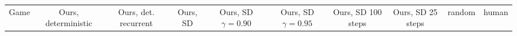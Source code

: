 \begin{landscape}
\begin{changemargin}{0cm}{0cm}
\begin{center}
\vspace*{\fill}
\setlength{\tabcolsep}{5pt}
\begin{table}[!htbp]
\scriptsize
\begin{tabular}{l|rl|rl|rl|rl|rl|rl|rl|c|c}

Game &          \multicolumn{2}{|c|}{Ours, deterministic}  &     \multicolumn{2}{|c|}{Ours, det. recurrent}   &     \multicolumn{2}{|c|}{Ours, SD} &     \multicolumn{2}{|c|}{Ours, SD $\gamma=0.90$}   &     \multicolumn{2}{|c|}{Ours, SD $\gamma=0.95$} &          \multicolumn{2}{|c|}{Ours, SD 100 steps}	&     \multicolumn{2}{|c|}{Ours, SD 25 steps} &		random &		human\\


\end{tabular}
\end{table}
\end{center}
\end{changemargin}
\end{landscape}
